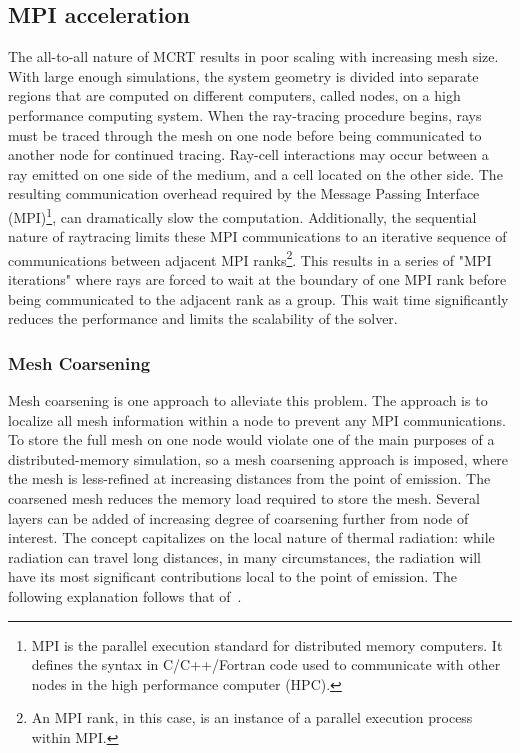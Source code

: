\subsection{MPI acceleration}\label{section:MPIacceleration}
The all-to-all nature of MCRT results in poor scaling with increasing mesh size. 
With large enough simulations, the system geometry is divided into separate regions that are computed on different computers, called nodes, on a high performance computing system. When the ray-tracing procedure begins, rays must be traced through the mesh on one node before being communicated to another node for continued tracing.
Ray-cell interactions may occur between a ray emitted on one side of the medium, and a cell located on the other side.
The resulting communication overhead required by the Message Passing Interface (MPI)\footnote{MPI is the parallel execution standard for distributed memory computers. It defines the syntax in C/C++/Fortran code used to communicate with other nodes in the high performance computer (HPC).}, can dramatically slow the computation. Additionally, the sequential nature of raytracing limits these MPI communications to an iterative sequence of communications between adjacent MPI ranks\footnote{An MPI rank, in this case, is an instance of a parallel execution process within MPI.}.
This results in a series of "MPI iterations" where rays are forced to wait at the boundary of one MPI rank before being communicated to the adjacent rank as a group. This wait time significantly reduces the performance and limits the scalability of the solver.

\subsubsection{Mesh Coarsening}
Mesh coarsening is one approach to alleviate this problem. The approach is to localize all mesh information within a node to prevent any MPI communications.
To store the full mesh on one node would violate one of the main purposes of a distributed-memory simulation, so a mesh coarsening approach is imposed, where the mesh is less-refined at increasing distances from the point of emission.
The coarsened mesh reduces the memory load required to store the mesh. Several layers can be added of increasing degree of coarsening further from node of interest. The concept capitalizes on the local nature of thermal radiation: 
while radiation can travel long distances, in many circumstances, the radiation will have its most significant contributions local to the point of emission.
The following explanation follows that of~\citet{Silvestri2019ASimulation}.

